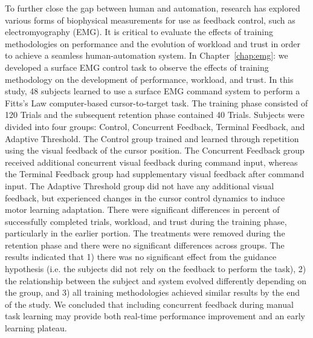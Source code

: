To further close the gap between human and automation, research has explored various forms of biophysical measurements for use as feedback control, such as electromyography (EMG).
It is critical to evaluate the effects of training methodologies on performance and the evolution of workload and trust in order to achieve a seamless human-automation system.
In Chapter~\ref{chap:emg}:  we developed a surface EMG control task to observe the effects of training methodology on the development of performance, workload, and trust.
In this study, 48 subjects learned to use a surface EMG command system to perform a Fitts's Law computer-based cursor-to-target task.
The training phase consisted of 120 Trials and the subsequent retention phase contained 40 Trials.
Subjects were divided into four groups: Control, Concurrent Feedback, Terminal Feedback, and Adaptive Threshold.
The Control group trained and learned through repetition using the visual feedback of the cursor position.
The Concurrent Feedback group received additional concurrent visual feedback during command input, whereas the Terminal Feedback group had supplementary visual feedback after command input.
The Adaptive Threshold group did not have any additional visual feedback, but experienced changes in the cursor control dynamics to induce motor learning adaptation.
There were significant differences in percent of successfully completed trials, workload, and trust during the training phase, particularly in the earlier portion.
The treatments were removed during the retention phase and there were no significant differences across groups.
The results indicated that 1) there was no significant effect from the guidance hypothesis (i.e. the subjects did not rely on the feedback to perform the task), 2) the relationship between the subject and system evolved differently depending on the group, and 3) all training methodologies achieved similar results by the end of the study.
We concluded that including concurrent feedback during manual task learning may provide both real-time performance improvement and an early learning plateau.

